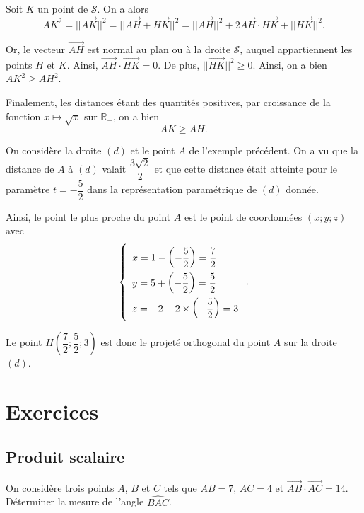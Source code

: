 \documentclass[11pt,fleqn, openany]{book} %
\begin{document}
\begin{demonstration} Soit $K$ un point de $\mathcal{S}$. On a alors\[ AK^2 = \lvert\lvert \overrightarrow{AK}\rvert\rvert^2 = \lvert\lvert\overrightarrow{AH}+\overrightarrow{HK}\rvert\rvert^2 = \lvert\lvert\overrightarrow{AH}\rvert\rvert^2 + 2 \overrightarrow{AH}\cdot \overrightarrow{HK} + \lvert\lvert\overrightarrow{HK}\rvert\rvert^2 .\]

Or, le vecteur $\overrightarrow{AH}$ est normal au plan ou à la droite $\mathcal{S}$, auquel appartiennent les points $H$ et $K$. Ainsi, $\overrightarrow{AH}\cdot \overrightarrow{HK}=0$. De plus, $\lvert\lvert\overrightarrow{HK}\rvert\rvert^2 \geqslant 0$. Ainsi, on a bien $AK^2 \geqslant AH ^2$.

Finalement, les distances étant des quantités positives, par croissance de la fonction $x \mapsto \sqrt{x}$ sur $\mathbb{R}_+$, on a bien
\[ AK \geqslant AH. \]\end{demonstration}

\begin{example}On considère la droite $(d)$ et le point $A$ de l'exemple précédent. On a vu que la distance de $A$ à $(d)$ valait $\dfrac{3\sqrt{2}}{2}$ et que cette distance était atteinte pour le paramètre $t=-\dfrac{5}{2}$ dans la représentation paramétrique de $(d)$ donnée.

Ainsi, le point le plus proche du point $A$ est le point de coordonnées $(x;y;z)$ avec
\[\left\{\renewcommand{\arraystretch}{2} \begin{array}{l}x=1-\left(-\dfrac{5}{2}\right)=\dfrac{7}{2} \\ y=5+\left(-\dfrac{5}{2}\right)=\dfrac{5}{2} \\ z = -2-2 \times \left(-\dfrac{5}{2}\right)=3 \\\end{array}\right. .\]

Le point $H\left(\dfrac{7}{2};\dfrac{5}{2};3\right)$ est donc le projeté orthogonal du point $A$ sur la droite $(d)$.\end{example}

\chapter{Exercices}

\section*{Produit scalaire}

\begin{exercise}[topic=geom11]On considère trois points $A$, $B$ et $C$ tels que $AB=7$, $AC=4$ et $\overrightarrow{AB}\cdot \overrightarrow{AC}=14$. Déterminer la mesure de l'angle $\widehat{BAC}$.\end{exercise}
\end{document}
